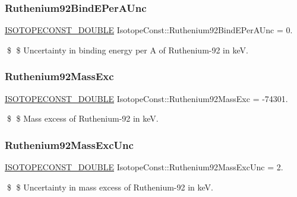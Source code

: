 \subsubsection{\texorpdfstring{Ruthenium92\+Bind\+E\+Per\+A\+Unc}{Ruthenium92BindEPerAUnc}}
{\footnotesize\ttfamily \mbox{\hyperlink{group___isotope_const-_macros_ga8f45a7272ce02c0b4c65c44636ed719a}{I\+S\+O\+T\+O\+P\+E\+C\+O\+N\+S\+T\+\_\+\+D\+O\+U\+B\+LE}} Isotope\+Const\+::\+Ruthenium92\+Bind\+E\+Per\+A\+Unc = 0.}

\$ \$ Uncertainty in binding energy per A of Ruthenium-\/92 in keV. \mbox{\label{group___isotope_const-_ruthenium-_ru92_gad776eec5a9e12d57794264cc4d1cedce}} 
\subsubsection{\texorpdfstring{Ruthenium92\+Mass\+Exc}{Ruthenium92MassExc}}
{\footnotesize\ttfamily \mbox{\hyperlink{group___isotope_const-_macros_ga8f45a7272ce02c0b4c65c44636ed719a}{I\+S\+O\+T\+O\+P\+E\+C\+O\+N\+S\+T\+\_\+\+D\+O\+U\+B\+LE}} Isotope\+Const\+::\+Ruthenium92\+Mass\+Exc = -\/74301.}

\$ \$ Mass excess of Ruthenium-\/92 in keV. \mbox{\label{group___isotope_const-_ruthenium-_ru92_ga46573aef54abb186aa47c81925598cad}} 
\subsubsection{\texorpdfstring{Ruthenium92\+Mass\+Exc\+Unc}{Ruthenium92MassExcUnc}}
{\footnotesize\ttfamily \mbox{\hyperlink{group___isotope_const-_macros_ga8f45a7272ce02c0b4c65c44636ed719a}{I\+S\+O\+T\+O\+P\+E\+C\+O\+N\+S\+T\+\_\+\+D\+O\+U\+B\+LE}} Isotope\+Const\+::\+Ruthenium92\+Mass\+Exc\+Unc = 2.}

\$ \$ Uncertainty in mass excess of Ruthenium-\/92 in keV. \mbox{\label{group___isotope_const-_ruthenium-_ru92_gab9e437f401b0ef537cc32545033672a1}} 
